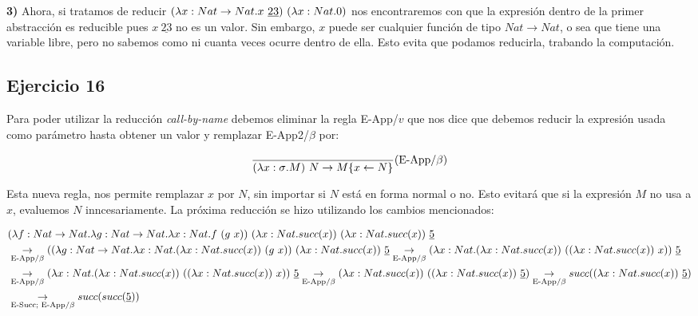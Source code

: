 \documentclass[10pt,a4paper, landscape]{article}
\begin{document}
\begin{multicols}{2}
\textbf{3)} Ahora, si tratamos de reducir $(\lambda x:  Nat\to Nat \text{.} x~\underline{23})~(\lambda x:  Nat \text{.} 0)$ nos encontraremos con que la expresión dentro de la primer abstracción es reducible pues $x~\underline{23}$ no es un valor. Sin embargo,  $x$ puede ser cualquier función de tipo  $ Nat\to Nat$, o sea que tiene una variable libre, pero no sabemos como ni cuanta veces ocurre dentro de ella. Esto evita que podamos reducirla, trabando la computación.
\end{multicols}


\newpage

\subsection{Ejercicio 16}
\begin{multicols}{2}
Para poder utilizar la reducción \textit{call-by-name} debemos eliminar la regla E-App/$v$ que nos dice que debemos reducir la expresión usada como parámetro hasta obtener un valor y remplazar E-App2/$\beta$ por:
\vfil

$$\frac{}{(\lambda x: \sigma \text{.} M)~N \to M\{x\leftarrow N\}}(\text{E-App/}\beta)$$

Esta nueva regla, nos permite remplazar $x$ por $N$, sin importar si $N$ está en forma normal o no. Esto evitará que si la expresión $M$ no usa a $x$, evaluemos $N$ inncesariamente. La próxima reducción se hizo utilizando los cambios mencionados:
\end{multicols}

\begin{equation*}
\begin{split}
&(\lambda f:  Nat\to Nat \text{.} \lambda g:  Nat\to Nat \text{.} \lambda x:  Nat \text{.} f~(g~x))~(\lambda x:  Nat \text{.} succ(x))~(\lambda x:  Nat \text{.} succ(x))~\underline{5} \\
    &\underset{\text{E-App}/\beta}{\to} ((\lambda g:  Nat\to Nat \text{.} \lambda x:  Nat \text{.} (\lambda x:  Nat \text{.} succ(x))~(g~x))~(\lambda x:  Nat \text{.} succ(x))~\underline{5}
\underset{\text{E-App}/\beta}{\to} (\lambda x:  Nat \text{.} (\lambda x:  Nat \text{.} succ(x))~((\lambda x:  Nat \text{.} succ(x))~x))~\underline{5}\\
&\underset{\text{E-App}/\beta}{\to} (\lambda x:  Nat \text{.} (\lambda x:  Nat \text{.} succ(x))~((\lambda x:  Nat \text{.} succ(x))~x))~\underline{5} 
\underset{\text{E-App}/\beta}{\to} (\lambda x:  Nat \text{.} succ(x))~((\lambda x:  Nat \text{.} succ(x))~\underline{5})
\underset{\text{E-App}/\beta}{\to} succ((\lambda x:  Nat \text{.} succ(x))~\underline{5}) \\
&\underset{\text{E-Succ; E-App}/\beta}{\to} succ(succ(\underline{5})) 
\end{split}
\end{equation*}
\end{document}
